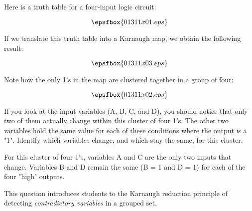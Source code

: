 

Here is a truth table for a four-input logic circuit:

$$\epsfbox{01311x01.eps}$$

If we translate this truth table into a Karnaugh map, we obtain the following result:

$$\epsfbox{01311x03.eps}$$

Note how the only 1's in the map are clustered together in a group of four:

$$\epsfbox{01311x02.eps}$$

If you look at the input variables (A, B, C, and D), you should notice that only two of them actually change within this cluster of four 1's.  The other two variables hold the same value for each of these conditions where the output is a "1".  Identify which variables change, and which stay the same, for this cluster.







For this cluster of four 1's, variables A and C are the only two inputs that change.  Variables B and D remain the same (B = 1 and D = 1) for each of the four "high" outputs.







This question introduces students to the Karnaugh reduction principle of detecting {\it contradictory variables} in a grouped set.





